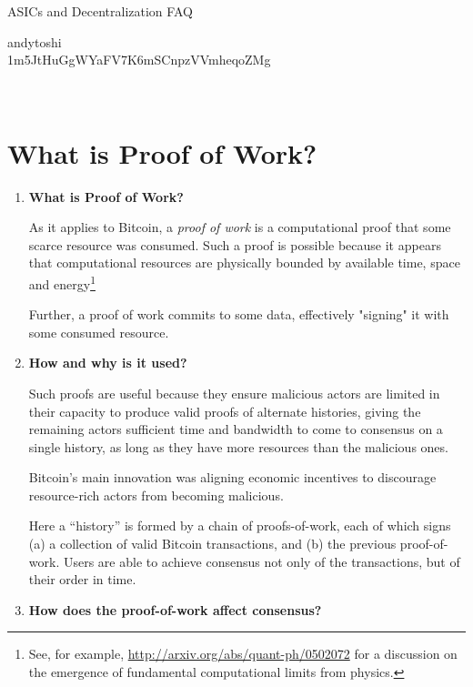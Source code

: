 \documentclass[letterpaper]{article}
\theoremstyle{xxx}
\theoremstyle{evil}
\theoremstyle{yyy}
\theoremstyle{plain}
\theoremstyle{zzz}
\begin{document}
\begin{minipage}[b]{0.7\linewidth}
{\huge ASICs and Decentralization FAQ}
\end{minipage}
\begin{minipage}[b]{0.3\linewidth}
  \begin{flushright}
    andytoshi{\tiny \\
    \tiny 1m5JtHuGgWYaFV7K6mSCnpzVVmheqoZMg}
  \end{flushright}
\end{minipage}
\\

\section{What is Proof of Work?}
\begin{enumerate}
\item \textbf{What is Proof of Work?}

As it applies to Bitcoin, a \emph{proof of work} is a computational proof
that some scarce resource was consumed. Such a proof is possible because
it appears that computational resources are physically bounded by available
time, space and energy\footnote{See, for example, \url{http://arxiv.org/abs/quant-ph/0502072}
for a discussion on the emergence of fundamental computational limits from
physics.}

Further, a proof of work commits to some data, effectively "signing" it
with some consumed resource.

\item \textbf{How and why is it used?}

Such proofs are useful because they ensure malicious actors are limited
in their capacity to produce valid proofs of alternate histories, giving
the remaining actors sufficient time and bandwidth to come to consensus
on a single history, as long as they have more resources than the malicious
ones.

Bitcoin's main innovation was aligning economic incentives to discourage
resource-rich actors from becoming malicious.

Here a ``history'' is formed by a chain of proofs-of-work, each of which
signs (a) a collection of valid Bitcoin transactions, and (b) the previous
proof-of-work. Users are able to achieve consensus not only of the transactions,
but of their order in time.

\item \textbf{How does the proof-of-work affect consensus?}


\end{enumerate}
\end{document}
